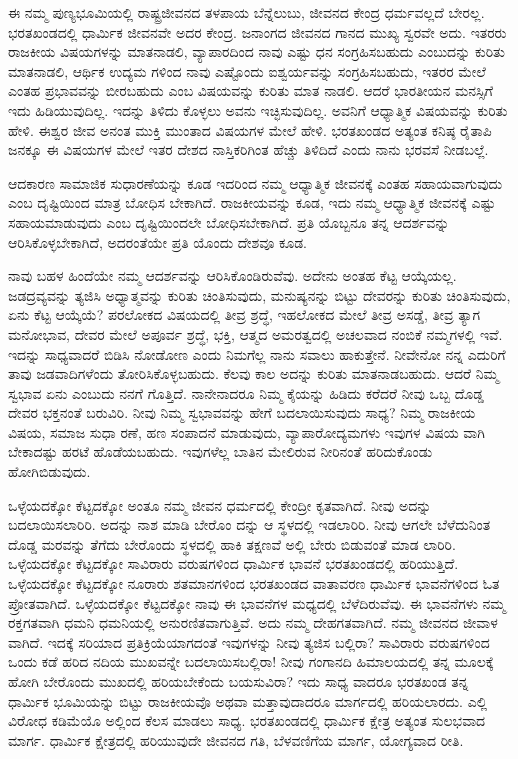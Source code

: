 ಈ ನಮ್ಮ ಪುಣ್ಯಭೂಮಿಯಲ್ಲಿ ರಾಷ್ಟ್ರಜೀವನದ ತಳಪಾಯ ಬೆನ್ನೆಲುಬು, ಜೀವನದ ಕೇಂದ್ರ ಧರ್ಮವಲ್ಲದೆ ಬೇರಲ್ಲ. ಭರತಖಂಡದಲ್ಲಿ ಧಾರ್ಮಿಕ ಜೀವನವೇ ಅದರ ಕೇಂದ್ರ. ಜನಾಂಗದ ಜೀವನದ ಗಾನದ ಮುಖ್ಯ ಸ್ವರವೇ ಅದು. ಇತರರು ರಾಜಕೀಯ ವಿಷಯಗಳನ್ನು ಮಾತನಾಡಲಿ, ವ್ಯಾಪಾರದಿಂದ ನಾವು ಎಷ್ಟು ಧನ ಸಂಗ್ರಹಿಸಬಹುದು ಎಂಬುದನ್ನು ಕುರಿತು ಮಾತನಾಡಲಿ, ಆರ್ಥಿಕ ಉದ್ಯಮ ಗಳಿಂದ ನಾವು ಎಷ್ಟೊಂದು ಐಶ್ವರ್ಯವನ್ನು ಸಂಗ್ರಹಿಸಬಹುದು, ಇತರರ ಮೇಲೆ ಎಂತಹ ಪ್ರಭಾವವನ್ನು ಬೀರಬಹುದು ಎಂಬ ವಿಷಯವನ್ನು ಕುರಿತು ಮಾತ ನಾಡಲಿ. ಆದರೆ ಭಾರತೀಯನ ಮನಸ್ಸಿಗೆ ಇದು ಹಿಡಿಯುವುದಿಲ್ಲ. ಇದನ್ನು ತಿಳಿದು ಕೊಳ್ಳಲು ಅವನು ಇಚ್ಛಿಸುವುದಿಲ್ಲ. ಅವನಿಗೆ ಆಧ್ಯಾತ್ಮಿಕ ವಿಷಯವನ್ನು ಕುರಿತು ಹೇಳಿ. ಈಶ್ವರ ಜೀವ ಅನಂತ ಮುಕ್ತಿ ಮುಂತಾದ ವಿಷಯಗಳ ಮೇಲೆ ಹೇಳಿ. ಭರತಖಂಡದ ಅತ್ಯಂತ ಕನಿಷ್ಠ ರೈತಾಪಿ ಜನಕ್ಕೂ ಈ ವಿಷಯಗಳ ಮೇಲೆ ಇತರ ದೇಶದ ನಾಸ್ತಿಕರಿಗಿಂತ ಹೆಚ್ಚು ತಿಳಿದಿದೆ ಎಂದು ನಾನು ಭರವಸೆ ನೀಡಬಲ್ಲೆ.

ಆದಕಾರಣ ಸಾಮಾಜಿಕ ಸುಧಾರಣೆಯನ್ನು ಕೂಡ ಇದರಿಂದ ನಮ್ಮ ಆಧ್ಯಾತ್ಮಿಕ ಜೀವನಕ್ಕೆ ಎಂತಹ ಸಹಾಯವಾಗುವುದು ಎಂಬ ದೃಷ್ಟಿಯಿಂದ ಮಾತ್ರ ಬೋಧಿಸ ಬೇಕಾಗಿದೆ. ರಾಜಕೀಯವನ್ನು ಕೂಡ, ಇದು ನಮ್ಮ ಆಧ್ಯಾತ್ಮಿಕ ಜೀವನಕ್ಕೆ ಎಷ್ಟು ಸಹಾಯಮಾಡುವುದು ಎಂಬ ದೃಷ್ಟಿಯಿಂದಲೇ ಬೋಧಿಸಬೇಕಾಗಿದೆ. ಪ್ರತಿ ಯೊಬ್ಬನೂ ತನ್ನ ಆದರ್ಶವನ್ನು ಆರಿಸಿಕೊಳ್ಳಬೇಕಾಗಿದೆ, ಅದರಂತೆಯೇ ಪ್ರತಿ ಯೊಂದು ದೇಶವೂ ಕೂಡ.

ನಾವು ಬಹಳ ಹಿಂದೆಯೇ ನಮ್ಮ ಆದರ್ಶವನ್ನು ಆರಿಸಿಕೊಂಡಿರುವೆವು. ಅದೇನು ಅಂತಹ ಕೆಟ್ಟ ಆಯ್ಕೆಯಲ್ಲ. ಜಡದ್ರವ್ಯವನ್ನು ತ್ಯಜಿಸಿ ಅಧ್ಯಾತ್ಮವನ್ನು ಕುರಿತು ಚಿಂತಿಸುವುದು, ಮನುಷ್ಯನನ್ನು ಬಿಟ್ಟು ದೇವರನ್ನು ಕುರಿತು ಚಿಂತಿಸುವುದು, ಏನು ಕೆಟ್ಟ ಆಯ್ಕೆಯೆ? ಪರಲೋಕದ ವಿಷಯದಲ್ಲಿ ತೀವ್ರ ಶ್ರದ್ಧೆ, ಇಹಲೋಕದ ಮೇಲೆ ತೀವ್ರ ಅಸಡ್ಡೆ, ತೀವ್ರ ತ್ಯಾಗ ಮನೋಭಾವ, ದೇವರ ಮೇಲೆ ಅಪೂರ್ವ ಶ್ರದ್ಧೆ, ಭಕ್ತಿ, ಆತ್ಮದ ಅಮರತ್ವದಲ್ಲಿ ಅಚಲವಾದ ನಂಬಿಕೆ ನಮ್ಮಗಳಲ್ಲಿ ಇವೆ. ಇದನ್ನು ಸಾಧ್ಯವಾದರೆ ಬಿಡಿಸಿ ನೋಡೋಣ ಎಂದು ನಿಮಗೆಲ್ಲ ನಾನು ಸವಾಲು ಹಾಕುತ್ತೇನೆ. ನೀವೇನೋ ನನ್ನ ಎದುರಿಗೆ ತಾವು ಜಡವಾದಿಗಳೆಂದು ತೋರಿಸಿಕೊಳ್ಳಬಹುದು. ಕೆಲವು ಕಾಲ ಅದನ್ನು ಕುರಿತು ಮಾತನಾಡಬಹುದು. ಆದರೆ ನಿಮ್ಮ ಸ್ವಭಾವ ಏನು ಎಂಬುದು ನನಗೆ ಗೊತ್ತಿದೆ. ನಾನೇನಾದರೂ ನಿಮ್ಮ ಕೈಯನ್ನು ಹಿಡಿದು ಕರೆದರೆ ನೀವು ಒಬ್ಬ ದೊಡ್ಡ ದೇವರ ಭಕ್ತನಂತೆ ಬರುವಿರಿ. ನೀವು ನಿಮ್ಮ ಸ್ವಭಾವವನ್ನು ಹೇಗೆ ಬದಲಾಯಿಸುವುದು ಸಾಧ್ಯ? ನಿಮ್ಮ ರಾಜಕೀಯ ವಿಷಯ, ಸಮಾಜ ಸುಧಾ ರಣೆ, ಹಣ ಸಂಪಾದನೆ ಮಾಡುವುದು, ವ್ಯಾಪಾರೋದ್ಯಮಗಳು ಇವುಗಳ ವಿಷಯ ವಾಗಿ ಬೇಕಾದಷ್ಟು ಹರಟೆ ಹೊಡೆಯಬಹುದು. ಇವುಗಳೆಲ್ಲ ಬಾತಿನ ಮೇಲಿರುವ ನೀರಿನಂತೆ ಹರಿದುಕೊಂಡು ಹೋಗಿಬಿಡುವುದು.

ಒಳ್ಳೆಯದಕ್ಕೋ ಕೆಟ್ಟದಕ್ಕೋ ಅಂತೂ ನಮ್ಮ ಜೀವನ ಧರ್ಮದಲ್ಲಿ ಕೇಂದ್ರೀ ಕೃತವಾಗಿದೆ. ನೀವು ಅದನ್ನು ಬದಲಾಯಿಸಲಾರಿರಿ. ಅದನ್ನು ನಾಶ ಮಾಡಿ ಬೇರೊಂ ದನ್ನು ಆ ಸ್ಥಳದಲ್ಲಿ ಇಡಲಾರಿರಿ. ನೀವು ಆಗಲೇ ಬೆಳೆದುನಿಂತ ದೊಡ್ಡ ಮರವನ್ನು ತೆಗೆದು ಬೇರೊಂದು ಸ್ಥಳದಲ್ಲಿ ಹಾಕಿ ತಕ್ಷಣವೆ ಅಲ್ಲಿ ಬೇರು ಬಿಡುವಂತೆ ಮಾಡ ಲಾರಿರಿ. ಒಳ್ಳೆಯದಕ್ಕೋ ಕೆಟ್ಟದಕ್ಕೋ ಸಾವಿರಾರು ವರುಷಗಳಿಂದ ಧಾರ್ಮಿಕ ಭಾವನೆ ಭರತಖಂಡದಲ್ಲಿ ಹರಿಯುತ್ತಿದೆ. ಒಳ್ಳೆಯದಕ್ಕೋ ಕೆಟ್ಟದಕ್ಕೋ ನೂರಾರು ಶತಮಾನಗಳಿಂದ ಭರತಖಂಡದ ವಾತಾವರಣ ಧಾರ್ಮಿಕ ಭಾವನೆಗಳಿಂದ ಓತ ಪ್ರೋತವಾಗಿದೆ. ಒಳ್ಳೆಯದಕ್ಕೋ ಕೆಟ್ಟದಕ್ಕೋ ನಾವು ಈ ಭಾವನೆಗಳ ಮಧ್ಯದಲ್ಲಿ ಬೆಳೆದಿರುವೆವು. ಈ ಭಾವನೆಗಳು ನಮ್ಮ ರಕ್ತಗತವಾಗಿ ಧಮನಿ ಧಮನಿಯಲ್ಲಿ ಅನುರಣಿತವಾಗುತ್ತಿವೆ. ಅದು ನಮ್ಮ ದೇಹಗತವಾಗಿದೆ. ನಮ್ಮ ಜೀವನದ ಜೀವಾಳ ವಾಗಿದೆ. ಇದಕ್ಕೆ ಸರಿಯಾದ ಪ್ರತಿಕ್ರಿಯೆಯಾಗದಂತೆ ಇವುಗಳನ್ನು ನೀವು ತ್ಯಜಿಸ ಬಲ್ಲಿರಾ? ಸಾವಿರಾರು ವರುಷಗಳಿಂದ ಒಂದು ಕಡೆ ಹರಿದ ನದಿಯ ಮುಖವನ್ನೇ ಬದಲಾಯಿಸಬಲ್ಲಿರಾ! ನೀವು ಗಂಗಾನದಿ ಹಿಮಾಲಯದಲ್ಲಿ ತನ್ನ ಮೂಲಕ್ಕೆ ಹೋಗಿ ಬೇರೊಂದು ಮುಖದಲ್ಲಿ ಹರಿಯಬೇಕೆಂದು ಬಯಸುವಿರಾ? ಇದು ಸಾಧ್ಯ ವಾದರೂ ಭರತಖಂಡ ತನ್ನ ಧಾರ್ಮಿಕ ಭೂಮಿಯನ್ನು ಬಿಟ್ಟು ರಾಜಕೀಯವೊ ಅಥವಾ ಮತ್ತಾವುದಾದರೂ ಮಾರ್ಗದಲ್ಲಿ ಹರಿಯಲಾರದು. ಎಲ್ಲಿ ವಿರೋಧ ಕಡಿಮೆಯೊ ಅಲ್ಲಿಂದ ಕೆಲಸ ಮಾಡಲು ಸಾಧ್ಯ. ಭರತಖಂಡದಲ್ಲಿ ಧಾರ್ಮಿಕ ಕ್ಷೇತ್ರ ಅತ್ಯಂತ ಸುಲಭವಾದ ಮಾರ್ಗ. ಧಾರ್ಮಿಕ ಕ್ಷೇತ್ರದಲ್ಲಿ ಹರಿಯುವುದೇ ಜೀವನದ ಗತಿ, ಬೆಳವಣಿಗೆಯ ಮಾರ್ಗ, ಯೋಗ್ಯವಾದ ರೀತಿ.

